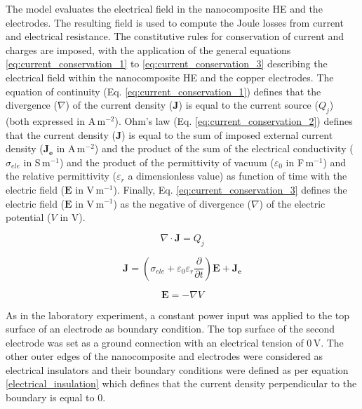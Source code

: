 The model evaluates the electrical field in the nanocomposite HE and the electrodes. 
The resulting field is used to compute the Joule losses from current and electrical resistance. 
The constitutive rules for conservation of current and charges are imposed, with the application of the general equations \ref{eq:current_conservation_1} to \ref{eq:current_conservation_3} describing the electrical field within the nanocomposite HE and the copper electrodes. 
The equation of continuity (Eq. \ref{eq:current_conservation_1}) defines that the divergence ($\nabla$) of the current density ($\mathbf{J}$) is equal to the current source ($Q_j$) (both expressed in \mbox{A\,m$^{-2}$}). 
Ohm’s law (Eq. \ref{eq:current_conservation_2}) defines that the current density ($\mathbf{J}$) is equal to the sum of imposed external current density ($\mathbf{J_e}$ in \mbox{A\,m$^{-2}$}) and the product of the sum of the electrical conductivity ($\sigma_{ele}$ in \mbox{S\,m$^{-1}$}) and the product of the permittivity of vacuum ($\varepsilon_0$ in \mbox{F\,m$^{-1}$}) and the relative permittivity ($\varepsilon_r$ a dimensionless value) as function of time with the electric field ($\mathbf{E}$ in \mbox{V\,m$^{-1}$}). 
Finally, Eq. \ref{eq:current_conservation_3} defines the electric field ($\mathbf{E}$ in \mbox{V\,m$^{-1}$}) as the negative of divergence ($\nabla$) of the electric potential ($V$ in V). 

\begin{equation}
\nabla \cdot \mathbf{J} = Q_j
\label{eq:current_conservation_1}
\end{equation}

\begin{equation}
\mathbf{J} = \left( \sigma_{ele} + \varepsilon_0 \varepsilon_r \frac{\partial}{\partial t} \right) \mathbf{E} + \mathbf{J_e}
\label{eq:current_conservation_2}
\end{equation}

\begin{equation}
\mathbf{E} = - \nabla V
\label{eq:current_conservation_3}
\end{equation}

As in the laboratory experiment, a constant power input was applied to the top surface of an electrode as boundary condition. 
The top surface of the second electrode was set as a ground connection with an electrical tension of 0\,V. 
The other outer edges of the nanocomposite and electrodes were considered as electrical insulators and their boundary conditions were defined as per equation \ref{electrical_insulation} which defines that the current density perpendicular to the boundary is equal to 0. 

